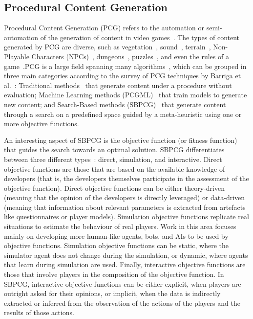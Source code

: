 \subsection{Procedural Content Generation}

Procedural Content Generation (PCG) refers to the automation or semi-automation of the generation of content in video games~\cite{hendrikx2013procedural}.  The types of content generated by PCG are diverse, such as vegetation~\cite{mora2021flora}, sound~\cite{plans2012experience}, terrain~\cite{frade2009breeding}, Non-Playable Characters (NPCs)~\cite{viana2022illuminating}, dungeons~\cite{viana2019survey}, puzzles~\cite{de2019procedural}, and even the rules of a game~\cite{browne2008automatic}.PCG is a large field spanning many algorithms~\cite{yannakakis2018artificial}, which can be grouped in three main categories according to the survey of PCG techniques by Barriga et al.~\cite{Barriga2019}: Traditional methods~\cite{freiknecht2017survey} that generate content under a procedure without evaluation; Machine Learning methods (PCGML)~\cite{Summerville2018,liu2021deep,souchleris2023reinforcement} that train models to generate new content; and Search-Based methods (SBPCG)~\cite{hendrikx2013procedural,togelius2011search} that generate content through a search on a predefined space guided by a meta-heuristic using one or more objective functions. 

An interesting aspect of SBPCG is the objective function (or fitness function) that guides the search towards an optimal solution. SBPCG differentiates between three different types~\cite{togelius2011search}: direct, simulation, and interactive. Direct objective functions are those that are based on the available knowledge of developers (that is, the developers themselves participate in the assessment of the objective function). Direct objective functions can be either theory-driven (meaning that the opinion of the developers is directly leveraged) or data-driven (meaning that information about relevant parameters is extracted from artefacts like questionnaires or player models). Simulation objective functions replicate real situations to estimate the behaviour of real players. Work in this area focuses mainly on developing more human-like agents, bots, and AIs to be used by objective functions. Simulation objective functions can be static, where the simulator agent does not change during the simulation, or dynamic, where agents that learn during simulation are used. Finally, interactive objective functions are those that involve players in the composition of the objective function.
In SBPCG, interactive objective functions can be either explicit, when players are outright asked for their opinions, or implicit, when the data is indirectly extracted or inferred from the observation of the actions of the players and the results of those actions.

